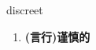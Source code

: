 
\begin{frame}
{\huge discreet}
\begin{center}
\begin{enumerate}\Large
  \item \textbf{(言行)谨慎的}
\end{enumerate}
\end{center}
\end{frame}
